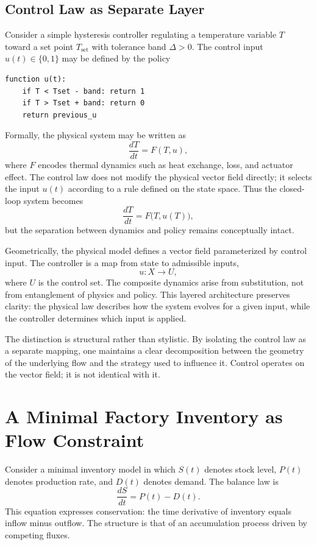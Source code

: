 \documentclass[12pt]{book}
\begin{document}
\subsection{Control Law as Separate Layer}

Consider a simple hysteresis controller regulating a temperature variable $T$
toward a set point $T_{\mathrm{set}}$ with tolerance band $\Delta > 0$. The
control input $u(t) \in \{0,1\}$ may be defined by the policy

\begin{verbatim}
function u(t):
    if T < Tset - band: return 1
    if T > Tset + band: return 0
    return previous_u
\end{verbatim}

Formally, the physical system may be written as
\[
\frac{dT}{dt} = F(T, u),
\]
where $F$ encodes thermal dynamics such as heat exchange, loss, and actuator
effect. The control law does not modify the physical vector field directly;
it selects the input $u(t)$ according to a rule defined on the state space.
Thus the closed-loop system becomes
\[
\frac{dT}{dt} = F\big(T, u(T)\big),
\]
but the separation between dynamics and policy remains conceptually intact.

Geometrically, the physical model defines a vector field parameterized by
control input. The controller is a map from state to admissible inputs,
\[
u : X \to U,
\]
where $U$ is the control set. The composite dynamics arise from substitution,
not from entanglement of physics and policy. This layered architecture
preserves clarity: the physical law describes how the system evolves for a
given input, while the controller determines which input is applied.

The distinction is structural rather than stylistic. By isolating the control
law as a separate mapping, one maintains a clear decomposition between the
geometry of the underlying flow and the strategy used to influence it.
Control operates on the vector field; it is not identical with it.

\section{A Minimal Factory Inventory as Flow Constraint}

Consider a minimal inventory model in which $S(t)$ denotes stock level,
$P(t)$ denotes production rate, and $D(t)$ denotes demand. The balance law is
\[
\frac{dS}{dt} = P(t) - D(t).
\]
This equation expresses conservation: the time derivative of inventory equals
inflow minus outflow. The structure is that of an accumulation process driven
by competing fluxes.
\end{document}
